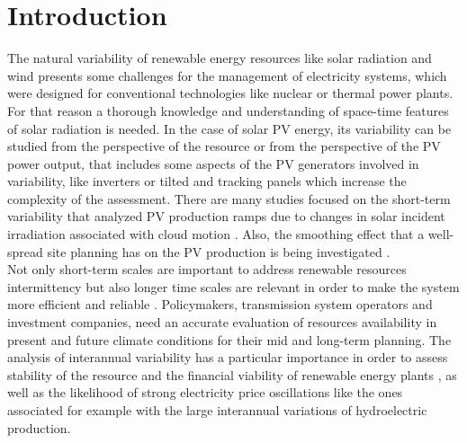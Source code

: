 \section{Introduction}



The natural variability of renewable energy resources like solar radiation and wind presents some challenges for the management of electricity systems, which were designed for conventional technologies like nuclear or thermal power plants. For that reason a thorough knowledge and understanding of space-time features of solar radiation is needed. In the case of solar PV energy,  its variability \citep{Widen2015} can be studied from the perspective of the resource or from the perspective of the PV power output, that includes some aspects of the PV generators involved in variability, like inverters or tilted and tracking panels which increase the complexity of the assessment. There are many studies focused on the short-term variability \citep{Zamo.Mestre.ea2014} that analyzed PV production ramps due to changes in solar incident irradiation associated with cloud motion \citep{Cros2014, IEA-PVPS-T14-1.32015}. Also, the smoothing effect that a well-spread site planning has on the PV production is being investigated \citep{Marcos2012, Perpinan.Marcos.ea2013}.\\

Not only short-term scales are important to address renewable resources intermittency but also longer time scales are relevant in order to make the system more efficient and reliable \citep{Davy2012}. Policymakers, transmission system operators and investment companies, need an accurate evaluation of resources availability in present and future climate conditions for their mid and long-term planning. The analysis of interannual variability has a particular importance in order to assess stability of the resource and the financial viability of renewable energy plants \citep{pryor2006inter}, as well as the likelihood of strong electricity price oscillations like the ones associated for example with the large interannual variations of hydroelectric production.\\

